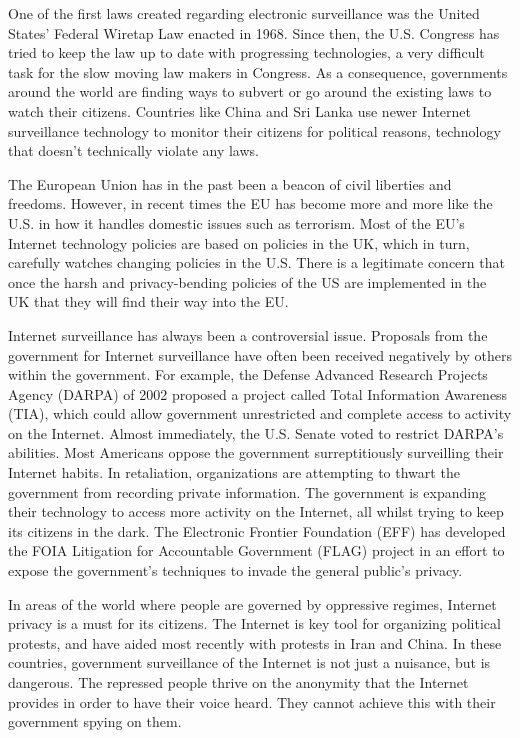 \documentclass[12pt,letterpaper]{article}
\begin{document}
\begin{flushleft}
One of the first laws created regarding electronic surveillance was the
United States' Federal Wiretap Law enacted in 1968. Since then, the U.S.
Congress has tried to keep the law up to date with progressing technologies,
a very difficult task for the slow moving law makers in Congress. As a
consequence, governments around the world are finding ways to subvert or go
around the existing laws to watch their citizens. Countries like China and
Sri Lanka use newer Internet surveillance technology to monitor their
citizens for political reasons, technology that doesn't technically violate
any laws.

The European Union has in the past been a beacon of civil liberties and
freedoms. However, in recent times the EU has become more and more like the
U.S. in how it handles domestic issues such as terrorism. Most of the EU’s
Internet technology policies are based on policies in the UK, which in turn,
carefully watches changing policies in the U.S. There is a legitimate
concern that once the harsh and privacy-bending policies of the US are
implemented in the UK that they will find their way into the EU.

Internet surveillance has always been a controversial issue. Proposals from
the government for Internet surveillance have often been received negatively
by others within the government. For example, the Defense Advanced Research
Projects Agency (DARPA) of 2002 proposed a project called Total Information
Awareness (TIA), which could allow government unrestricted and complete
access to activity on the Internet. Almost immediately, the U.S. Senate
voted to restrict DARPA's abilities. Most Americans oppose the government
surreptitiously surveilling their Internet habits. In retaliation,
organizations are attempting to thwart the government from recording private
information. The government is expanding their technology to access more
activity on the Internet, all whilst trying to keep its citizens in the
dark. The Electronic Frontier Foundation (EFF) has developed the FOIA
Litigation for Accountable Government (FLAG) project in an effort to expose
the government’s techniques to invade the general public's privacy.

In areas of the world where people are governed by oppressive regimes,
Internet privacy is a must for its citizens. The Internet is key tool for
organizing political protests, and have aided most recently with protests in
Iran and China. In these countries, government surveillance of the Internet
is not just a nuisance, but is dangerous. The repressed people thrive on the
anonymity that the Internet provides in order to have their voice heard.
They cannot achieve this with their government spying on them.


\end{flushleft}
\end{document}
